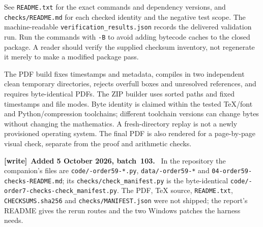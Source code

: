 \documentclass[11pt]{article}
\theoremstyle{remark}\newtheorem{remark}[theorem]{Remark}
\numberwithin{equation}{section}
\newenvironment{writenote}[1][]{\par\smallskip\begingroup\small
 \noindent\textbf{[write]}\if\relax\detokenize{#1}\relax\else~\textbf{#1.}\fi\ }%
 {\par\endgroup\smallskip}
\begin{document}
See \texttt{README.txt} for the exact commands and dependency versions,
and \texttt{checks/README.md} for each checked identity and the negative
test scope. The machine-readable \texttt{verification\_\allowbreak results.json}
records the delivered validation run. Run the commands with
\texttt{-B} to avoid adding bytecode caches to the closed package.
A reader should verify the supplied checksum inventory, not regenerate
it merely to make a modified package pass.

The PDF build fixes timestamps and metadata, compiles in two independent
clean temporary directories, rejects overfull boxes and unresolved
references, and requires byte-identical PDFs. The ZIP builder uses
sorted paths and fixed timestamps and file modes. Byte identity is
claimed within the tested TeX/font and Python/compression toolchains;
different toolchain versions can change bytes without changing the
mathematics. A fresh-directory replay is not a newly provisioned
operating system. The final PDF is also rendered for a page-by-page
visual check, separate from the proof and arithmetic checks.
\begin{writenote}[Added 5 October 2026, batch~103]
\sloppy{}\relax In the repository the companion's files are \texttt{code/-order59-*.py}, \texttt{data/-order59-*} and \texttt{04-order59-\allowbreak checks-README.md}; its \texttt{checks/\allowbreak check\_manifest.py} is the byte-identical \texttt{code/-order7-checks-\allowbreak check\_manifest.py}. The PDF, TeX source, \texttt{README.txt}, \texttt{CHECKSUMS.sha256} and \texttt{checks/\allowbreak MANIFEST.json} were not shipped; the report's README gives the rerun routes and the two Windows patches the harness needs.
\end{writenote}
\end{document}
